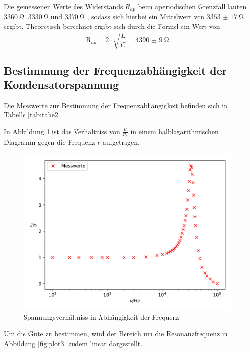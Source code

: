 Die gemessenen Werte des Widerstands $R_{ap}$ beim aperiodischen Grenzfall lauten
$\SI{3360}{\ohm}$, $\SI{3330}{\ohm}$ und $\SI{3370}{\ohm}$ , sodass sich hierbei ein Mittelwert
von $\SI{3353(17)}{\ohm}$ ergibt.
\noindent Theoretisch berechnet ergibt sich durch die Formel %
ein Wert von
\begin{equation*}
  \text{R}_{ap}= 2 \cdot \sqrt{\frac{L}{C}} = \SI{4390(9)}{\ohm}
\end{equation*}


\subsection{Bestimmung der Frequenzabhängigkeit der Kondensatorspannung}

Die Messwerte zur Bestimmung der Frequenzabhängigkeit befinden sich in Tabelle \ref{tab:tabe2}.


\noindent In Abbildung \ref{fig:plot2} ist das Verhältniss von $ \frac{U}{U_c} $ in einem
halblogarithmischen Diagramm gegen die Frequenz $ \nu $ aufgetragen.

\begin{figure}[H]
  \centering
  \includegraphics{plot2.pdf}
  \caption{Spannungsverhältniss in Abhängigkeit der Frequenz}
  \label{fig:plot2}
\end{figure}
\noindent Um die Güte zu bestimmen, wird der Bereich um die Resonanzfrequenz
in Abbildung \ref{fig:plot3}
zudem linear dargestellt.

